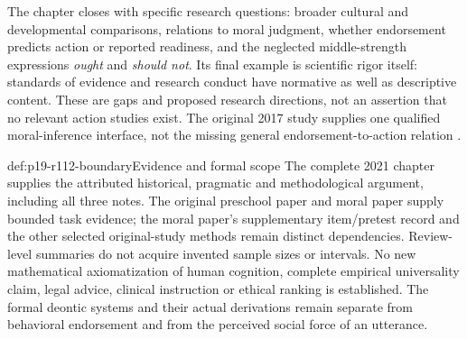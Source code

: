 The chapter closes with specific research questions: broader cultural and
developmental comparisons, relations to moral judgment, whether endorsement
predicts action or reported readiness, and the neglected middle-strength
expressions \emph{ought} and \emph{should not}. Its final example is scientific
rigor itself: standards of evidence and research conduct have normative as
well as descriptive content. These are gaps and proposed research directions,
not an assertion that no relevant action studies exist. The original 2017
study supplies one qualified moral-inference interface, not the missing
general endorsement-to-action relation
\cite[p.~655]{Elqayam2021DeonticPsychology}.

\begin{proofboundary}{def:p19-r112-boundary}{Evidence and formal scope}
The complete 2021 chapter supplies the attributed historical, pragmatic and
methodological argument, including all three notes. The original preschool
paper and moral paper supply bounded task evidence; the moral paper's
supplementary item/pretest record and the other selected original-study
methods remain distinct dependencies. Review-level summaries do not acquire
invented sample sizes or intervals. No new mathematical axiomatization of
human cognition, complete empirical universality claim, legal advice,
clinical instruction or ethical ranking is established. The formal deontic
systems and their actual derivations remain separate from behavioral
endorsement and from the perceived social force of an utterance.
\end{proofboundary}
